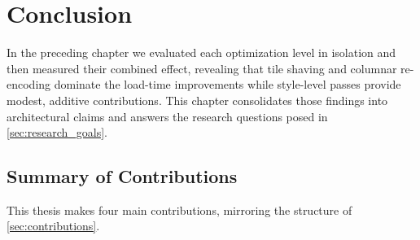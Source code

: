 \chapter{Conclusion}\label{ch:conclusion}

In the preceding chapter we evaluated each optimization level in isolation and then measured their combined effect, revealing that tile shaving and columnar re-encoding dominate the load-time improvements while style-level passes provide modest, additive contributions.
This chapter consolidates those findings into architectural claims and answers the research questions posed in \cref{sec:research_goals}.

\section{Summary of Contributions}

This thesis makes four main contributions, mirroring the structure of \cref{sec:contributions}.

